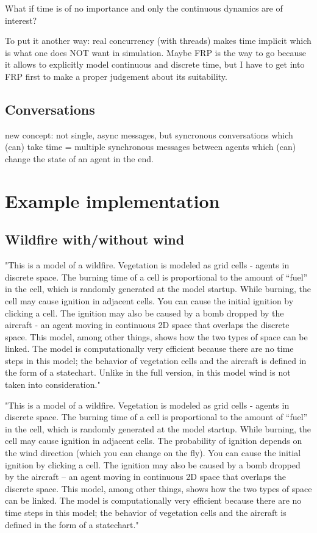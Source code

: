 \documentclass{article}
\begin{document}
What if time is of no importance and only the continuous dynamics are of interest?

To put it another way: real concurrency (with threads) makes time implicit which is what one does NOT want in simulation. Maybe FRP is the way to go because it allows to explicitly model continuous and discrete time, but I have to get into FRP first to make a proper judgement about its suitability.

\subsection{Conversations}
new concept: not single, async messages, but syncronous conversations which (can) take time = multiple synchronous messages between agents which (can) change the state of an agent in the end.

\section{Example implementation}

\subsection{Wildfire with/without wind}
"This is a model of a wildfire. Vegetation is modeled as grid cells - agents in discrete space. The burning time of a cell is proportional to the amount of “fuel” in the cell, which is randomly generated at the model startup. While burning, the cell may cause ignition in adjacent cells. You can cause the initial ignition by clicking a cell. The ignition may also be caused by a bomb dropped by the aircraft - an agent moving in continuous 2D space that overlaps the discrete space. This model, among other things, shows how the two types of space can be linked. The model is computationally very efficient because there are no time steps in this model; the behavior of vegetation cells and the aircraft is defined in the form of a statechart. Unlike in the full version, in this model wind is not taken into consideration."

"This is a model of a wildfire. Vegetation is modeled as grid cells - agents in discrete space. The burning time of a cell is proportional to the amount of “fuel” in the cell, which is randomly generated at the model startup. While burning, the cell may cause ignition in adjacent cells. The probability of ignition depends on the wind direction (which you can change on the fly). You can cause the initial ignition by clicking a cell. The ignition may also be caused by a bomb dropped by the aircraft – an agent moving in continuous 2D space that overlaps the discrete space. This model, among other things, shows how the two types of space can be linked. The model is computationally very efficient because there are no time steps in this model; the behavior of vegetation cells and the aircraft is defined in the form of a statechart."
\end{document}
